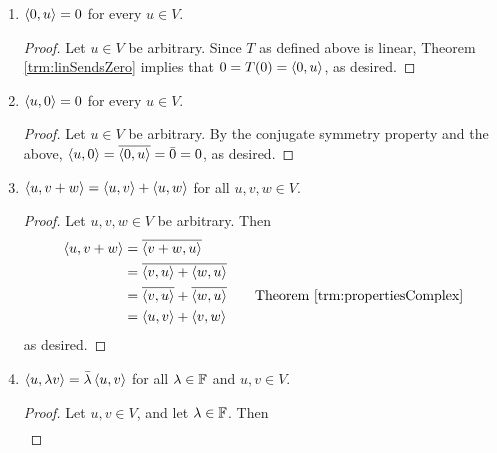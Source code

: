 \documentclass[../main.tex]{subfiles}
\begin{document}
\begin{itemize}
\begin{theorem}
\begin{enumerate}[label={\textup{(}\alph*\textup{)}},ref={\thetheorem\alph*}]
\begin{proof}
                \begin{align*}
                    T(v+w) &= \inp{v+w}{u}&
                        T(\lambda v) &= \inp{\lambda v}{u}\\
                    &= \inp{v}{u}+\inp{w}{u}&
                        &= \lambda\inp{v}{u}\\
                    &= Tv+Tw&
                        &= \lambda Tv
                \end{align*}
                as desired.
            \end{proof}
            \item \label{trm:inpPropertiesb}$\left\langle{0},{u}\right\rangle=0$ for every $u\in V$.
            \begin{proof}
                Let $u\in V$ be arbitrary. Since $T$ as defined above is linear, Theorem \ref{trm:linSendsZero} implies that $0=T(0)=\left\langle{0},{u}\right\rangle$, as desired.
            \end{proof}
            \item \label{trm:inpPropertiesc}$\left\langle{u},{0}\right\rangle=0$ for every $u\in V$.
            \begin{proof}
                Let $u\in V$ be arbitrary. By the conjugate symmetry property and the above, $\left\langle{u},{0}\right\rangle=\overline{\left\langle{0},{u}\right\rangle}=\bar{0}=0$, as desired.
            \end{proof}
            \item \label{trm:inpPropertiesd}$\left\langle{u},{v+w}\right\rangle=\left\langle{u},{v}\right\rangle+\left\langle{u},{w}\right\rangle$ for all $u,v,w\in V$.
            \begin{proof}
                Let $u,v,w\in V$ be arbitrary. Then
                \begin{align*}
                    \inp{u}{v+w} &= \overline{\inp{v+w}{u}}\\
                    &= \overline{\inp{v}{u}+\inp{w}{u}}\\
                    &= \overline{\inp{v}{u}}+\overline{\inp{w}{u}}\tag*{Theorem \ref{trm:propertiesComplex}}\\
                    &= \inp{u}{v}+\inp{v}{w}
                \end{align*}
                as desired.
            \end{proof}
            \item \label{trm:inpPropertiese}$\left\langle{u},{\lambda v}\right\rangle=\bar{\lambda}\left\langle{u},{v}\right\rangle$ for all $\lambda\in\mathbb{F}$ and $u,v\in V$.
            \begin{proof}
                Let $u,v\in V$, and let $\lambda\in\mathbb{F}$. Then
                \begin{align*}

\end{align*}
\end{proof}
\end{enumerate}
\end{theorem}
\end{itemize}
\end{document}

